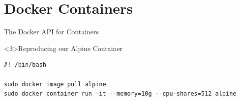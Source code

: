 \documentclass[10pt, compress, aspectratio=169, xcolor={table,usenames,dvipsnames}]{beamer}
\begin{document}
\section{Docker Containers}
\label{sec:orgd89a0b5}
\begin{frame}[label={sec:org876f413},fragile]{The Docker API for Containers}

\begin{block}<3>{Reproducing our Alpine Container}
\lstset{language=bash,label= ,caption= ,captionpos=b,numbers=none}
\begin{lstlisting}
#! /bin/bash

sudo docker image pull alpine
sudo docker container run -it --memory=10g --cpu-shares=512 alpine
\end{lstlisting}
\end{block}
\end{frame}
\end{document}
